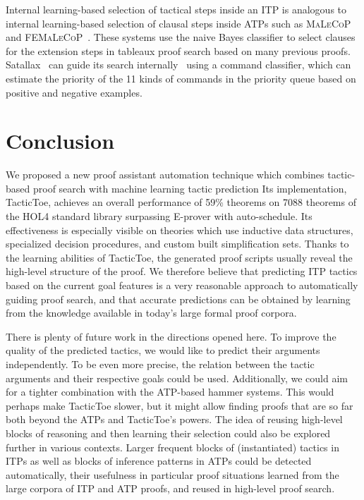 \documentclass[runningheads,a4paper,draft]{svjour3}
\newcommand{\todoi}[1]{\todo[inline]{#1}}
\def\holfour{\textsf{HOL4}\xspace}
\def\hollight{\textsf{HOL Light}\xspace}
\def\eprover{\textsf{E-prover}\xspace}
\def\tactictoe{\textsf{TacticToe}\xspace}
\begin{document}
Internal learning-based selection of tactical steps inside an ITP is analogous 
to internal learning-based selection of clausal steps inside ATPs such as 
\textsc{MaLeCoP}~\cite{malecop} and \textsc{FEMaLeCoP}~\cite{femalecop}. These 
systems
use the naive Bayes classifier to  select clauses for the extension steps in
tableaux proof search based on many previous proofs. Satallax~\cite{Brown2012a} 
can guide its
search internally~\cite{mllax} using a command classifier, which can estimate 
the priority of the 11 kinds of
commands in the priority queue based on positive and negative examples.


\section{Conclusion}\label{sec:concl}


\todoi{Is copied and modified}
We proposed a new proof assistant automation technique which combines 
tactic-based proof search with machine learning tactic prediction
Its implementation,
\tactictoe, achieves an overall performance of 59\% theorems on 7088 theorems  
of the \holfour standard library surpassing \eprover with 
auto-schedule. Its 
effectiveness is especially visible on 
theories which use inductive data structures, specialized decision procedures, 
and custom built simplification sets.
Thanks to the learning abilities of \tactictoe, the generated proof scripts 
usually reveal the high-level structure of the proof. %
We therefore believe that predicting ITP tactics based on the current goal 
features is a very reasonable approach to automatically guiding proof search, 
and that accurate predictions can be obtained by learning from the knowledge 
available in today's large formal proof corpora. 



There is plenty of future work in the directions opened here.
To improve the quality of the predicted tactics, 
we would like to predict their arguments independently.
To be even more precise, the relation between the 
tactic arguments and their respective goals could be used.
Additionally, we could aim for a tighter combination with the ATP-based hammer
systems. This would perhaps make \tactictoe slower, but it might allow
finding proofs that are so far both beyond the ATPs and \tactictoe's
powers. The idea of reusing high-level blocks of reasoning and
then learning their selection could also be explored
further in various contexts. Larger frequent blocks of (instantiated) tactics
in ITPs as well as blocks of inference patterns in ATPs could be detected
automatically, their
usefulness in particular proof situations learned from the large corpora of
ITP and ATP proofs, and reused in high-level proof search.
\end{document}
